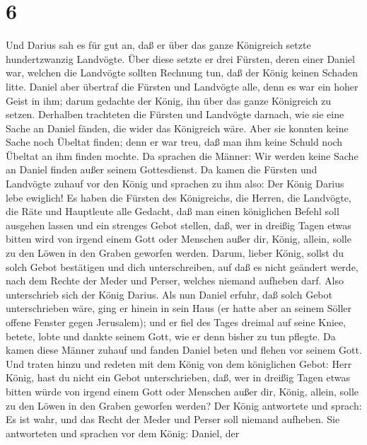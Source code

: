 \hypertarget{section-5}{%
\section{6}\label{section-5}}

 Und Darius sah es für gut an, daß er über das ganze
Königreich setzte hundertzwanzig Landvögte.  Über diese
setzte er drei Fürsten, deren einer Daniel war, welchen die Landvögte
sollten Rechnung tun, daß der König keinen Schaden litte. 
Daniel aber übertraf die Fürsten und Landvögte alle, denn es war ein
hoher Geist in ihm; darum gedachte der König, ihn über das ganze
Königreich zu setzen.  Derhalben trachteten die Fürsten und
Landvögte darnach, wie sie eine Sache an Daniel fänden, die wider das
Königreich wäre. Aber sie konnten keine Sache noch Übeltat finden; denn
er war treu, daß man ihm keine Schuld noch Übeltat an ihm finden mochte.
 Da sprachen die Männer: Wir werden keine Sache an Daniel
finden außer seinem Gottesdienst.  Da kamen die Fürsten und
Landvögte zuhauf vor den König und sprachen zu ihm also: Der König
Darius lebe ewiglich!  Es haben die Fürsten des Königreichs,
die Herren, die Landvögte, die Räte und Hauptleute alle Gedacht, daß man
einen königlichen Befehl soll ausgehen lassen und ein strenges Gebot
stellen, daß, wer in dreißig Tagen etwas bitten wird von irgend einem
Gott oder Menschen außer dir, König, allein, solle zu den Löwen in den
Graben geworfen werden.  Darum, lieber König, sollst du
solch Gebot bestätigen und dich unterschreiben, auf daß es nicht
geändert werde, nach dem Rechte der Meder und Perser, welches niemand
aufheben darf.  Also unterschrieb sich der König Darius.
 Als nun Daniel erfuhr, daß solch Gebot unterschrieben
wäre, ging er hinein in sein Haus (er hatte aber an seinem Söller offene
Fenster gegen Jerusalem); und er fiel des Tages dreimal auf seine Kniee,
betete, lobte und dankte seinem Gott, wie er denn bisher zu tun pflegte.
 Da kamen diese Männer zuhauf und fanden Daniel beten und
flehen vor seinem Gott.  Und traten hinzu und redeten mit
dem König von dem königlichen Gebot: Herr König, hast du nicht ein Gebot
unterschrieben, daß, wer in dreißig Tagen etwas bitten würde von irgend
einem Gott oder Menschen außer dir, König, allein, solle zu den Löwen in
den Graben geworfen werden? Der König antwortete und sprach: Es ist
wahr, und das Recht der Meder und Perser soll niemand aufheben.
 Sie antworteten und sprachen vor dem König: Daniel, der
